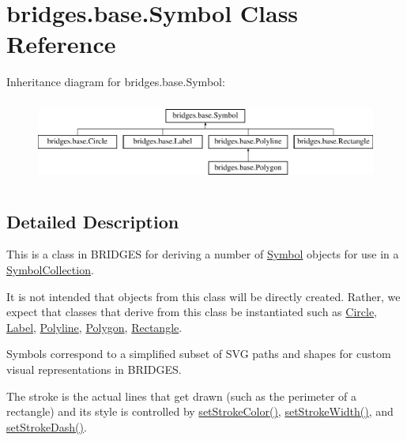 \hypertarget{classbridges_1_1base_1_1_symbol}{}\section{bridges.\+base.\+Symbol Class Reference}
\label{classbridges_1_1base_1_1_symbol}
Inheritance diagram for bridges.\+base.\+Symbol\+:\begin{figure}[H]
\begin{center}
\leavevmode
\includegraphics[height=2.745098cm]{classbridges_1_1base_1_1_symbol}
\end{center}
\end{figure}


\subsection{Detailed Description}
This is a class in B\+R\+I\+D\+G\+ES for deriving a number of \mbox{\hyperlink{classbridges_1_1base_1_1_symbol}{Symbol}} objects for use in a \mbox{\hyperlink{classbridges_1_1base_1_1_symbol_collection}{Symbol\+Collection}}. 

It is not intended that objects from this class will be directly created. Rather, we expect that classes that derive from this class be instantiated such as \mbox{\hyperlink{classbridges_1_1base_1_1_circle}{Circle}}, \mbox{\hyperlink{classbridges_1_1base_1_1_label}{Label}}, \mbox{\hyperlink{classbridges_1_1base_1_1_polyline}{Polyline}}, \mbox{\hyperlink{classbridges_1_1base_1_1_polygon}{Polygon}}, \mbox{\hyperlink{classbridges_1_1base_1_1_rectangle}{Rectangle}}.

Symbols correspond to a simplified subset of S\+VG paths and shapes for custom visual representations in B\+R\+I\+D\+G\+ES.

The stroke is the actual lines that get drawn (such as the perimeter of a rectangle) and its style is controlled by \mbox{\hyperlink{classbridges_1_1base_1_1_symbol_a387a5a5691e55e84a1d0367ca2066806}{set\+Stroke\+Color()}}, \mbox{\hyperlink{classbridges_1_1base_1_1_symbol_a68f46f0e555e916c59a69d2b3e9e495d}{set\+Stroke\+Width()}}, and \mbox{\hyperlink{classbridges_1_1base_1_1_symbol_ad36224ec7cb588dbbaa8040ef59ffbfc}{set\+Stroke\+Dash()}}.

